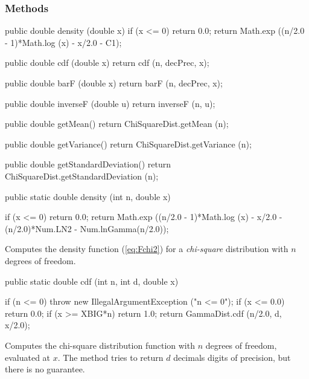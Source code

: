 \subsubsection* {Methods}

\begin{code}\begin{hide}

   public double density (double x) {
      if (x <= 0)
         return 0.0;
      return Math.exp ((n/2.0 - 1)*Math.log (x) - x/2.0 - C1);
   }

   public double cdf (double x) {
      return cdf (n, decPrec, x);
   }

   public double barF (double x) {
      return barF (n, decPrec, x);
   }

   public double inverseF (double u) {
      return inverseF (n, u);
   }

   public double getMean() {
      return ChiSquareDist.getMean (n);
   }

   public double getVariance() {
      return ChiSquareDist.getVariance (n);
   }

   public double getStandardDeviation() {
      return ChiSquareDist.getStandardDeviation (n);
   }\end{hide}

   public static double density (int n, double x)\begin{hide} {
      if (x <= 0)
         return 0.0;
      return Math.exp ((n/2.0 - 1)*Math.log (x) - x/2.0 -
                  (n/2.0)*Num.LN2 - Num.lnGamma(n/2.0));
   }\end{hide}
\end{code}
\begin{tabb} Computes the density function (\ref{eq:Fchi2})
  for a {\em chi-square\/} distribution with  $n$ degrees of freedom.
\end{tabb}
\begin{code}

   public static double cdf (int n, int d, double x)\begin{hide} {
      if (n <= 0)
        throw new IllegalArgumentException ("n <= 0");
      if (x <= 0.0)
         return 0.0;
      if (x >= XBIG*n)
         return 1.0;
      return GammaDist.cdf (n/2.0, d, x/2.0);
   }\end{hide}
\end{code}
\begin{tabb}
  Computes the chi-square distribution function with $n$ degrees of freedom,
 evaluated at $x$. The method tries to return $d$ decimals digits of precision,
  but there is no guarantee.
 \end{tabb}
